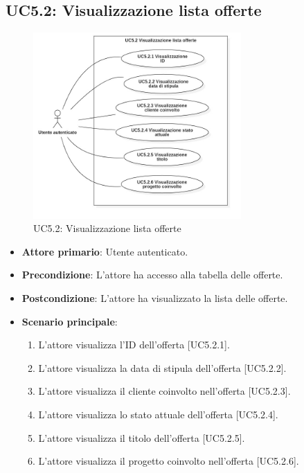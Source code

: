 \pagebreak

\subsection{UC5.2: Visualizzazione lista offerte}
\begin{figure}[!h]
\centering
\includegraphics[width=300px]{../images/UC/.jpeg/UC5.2.0-visualizzazioneListaOfferte.jpg}
\caption{UC5.2: Visualizzazione lista offerte}
\end{figure}

\begin{itemize}
\item \textbf{Attore primario}: Utente autenticato.
\item \textbf{Precondizione}: L'attore ha accesso alla tabella delle offerte.
\item \textbf{Postcondizione}: L'attore ha visualizzato la lista delle offerte.
\item \textbf{Scenario principale}: 
\begin{enumerate}
\item L'attore visualizza l'ID dell'offerta [UC5.2.1].
\item L'attore visualizza la data di stipula dell'offerta [UC5.2.2].
\item L'attore visualizza il cliente coinvolto nell'offerta [UC5.2.3].
\item L'attore visualizza lo stato attuale dell'offerta [UC5.2.4].
\item L'attore visualizza il titolo dell'offerta [UC5.2.5].
\item L'attore visualizza il progetto coinvolto nell'offerta [UC5.2.6].
\end{enumerate}
\end{itemize}

\pagebreak

